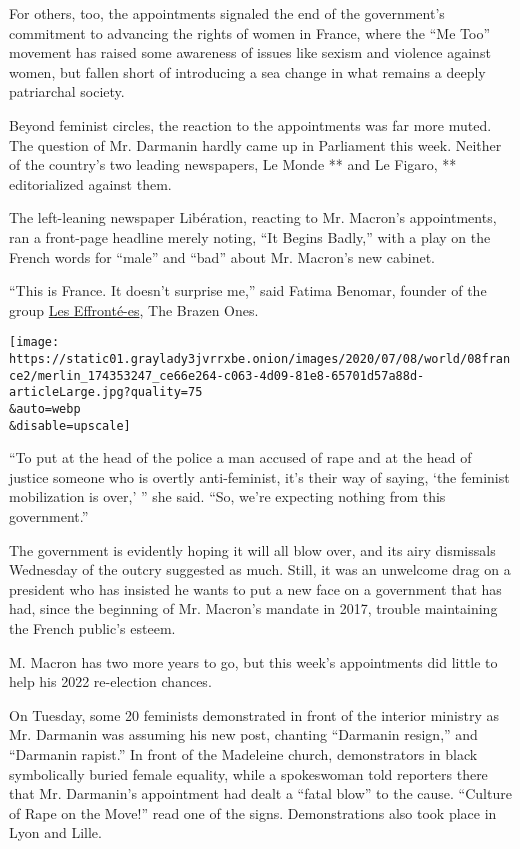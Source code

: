 For others, too, the appointments signaled the end of the government's
commitment to advancing the rights of women in France, where the ``Me
Too'' movement has raised some awareness of issues like sexism and
violence against women, but fallen short of introducing a sea change in
what remains a deeply patriarchal society.

Beyond feminist circles, the reaction to the appointments was far more
muted. The question of Mr. Darmanin hardly came up in Parliament this
week. Neither of the country's two leading newspapers, Le Monde ** and
Le Figaro, ** editorialized against them.

The left-leaning newspaper Libération, reacting to Mr. Macron's
appointments, ran a front-page headline merely noting, ``It Begins
Badly,'' with a play on the French words for ``male'' and ``bad'' about
Mr. Macron's new cabinet.

``This is France. It doesn't surprise me,'' said Fatima Benomar, founder
of the group \href{https://effrontees.wordpress.com/}{Les Effronté-es},
The Brazen Ones.

\texttt{[image: https://static01.graylady3jvrrxbe.onion/images/2020/07/08/world/08france2/merlin\_174353247\_ce66e264-c063-4d09-81e8-65701d57a88d-articleLarge.jpg?quality=75\\\&auto=webp\\\&disable=upscale]}

``To put at the head of the police a man accused of rape and at the head
of justice someone who is overtly anti-feminist, it's their way of
saying, `the feminist mobilization is over,' '' she said. ``So, we're
expecting nothing from this government.''

The government is evidently hoping it will all blow over, and its airy
dismissals Wednesday of the outcry suggested as much. Still, it was an
unwelcome drag on a president who has insisted he wants to put a new
face on a government that has had, since the beginning of Mr. Macron's
mandate in 2017, trouble maintaining the French public's esteem.

M. Macron has two more years to go, but this week's appointments did
little to help his 2022 re-election chances.

On Tuesday, some 20 feminists demonstrated in front of the interior
ministry as Mr. Darmanin was assuming his new post, chanting ``Darmanin
resign,'' and ``Darmanin rapist.'' In front of the Madeleine church,
demonstrators in black symbolically buried female equality, while a
spokeswoman told reporters there that Mr. Darmanin's appointment had
dealt a ``fatal blow'' to the cause. ``Culture of Rape on the Move!''
read one of the signs. Demonstrations also took place in Lyon and Lille.


